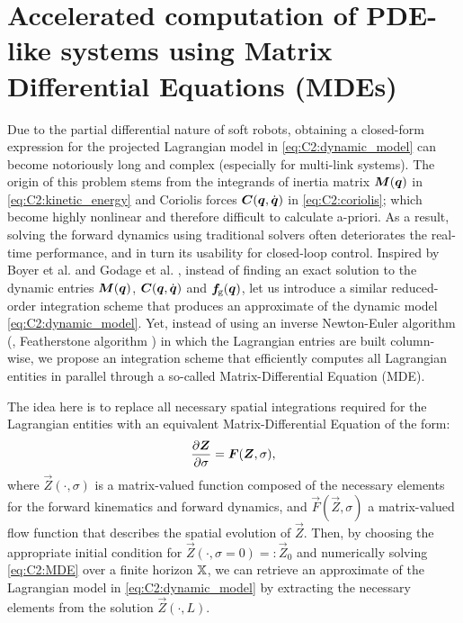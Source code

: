 \section[Accelerated computation of PDE-like systems]{Accelerated computation of PDE-like systems using Matrix Differential Equations (MDEs)}
\label{sec: chap2 section header}
Due to the partial differential nature of soft robots, obtaining a closed-form expression for the projected Lagrangian model in \eqref{eq:C2:dynamic_model} can become notoriously long and complex (especially for multi-link systems). The origin of this problem stems from the integrands of inertia matrix $\boldsymbol{M}({\boldsymbol{q}})$ in \eqref{eq:C2:kinetic_energy} and Coriolis forces $\boldsymbol{C}({\boldsymbol{q}},{\dot{\boldsymbol{q}}})$ in \eqref{eq:C2:coriolis}; which become highly nonlinear and therefore difficult to calculate a-priori. As a result, solving the forward dynamics using traditional solvers often deteriorates the real-time performance, and in turn its usability for closed-loop control. Inspired by Boyer et al. \cite{Boyer2021} and Godage et al. 
\cite{Godage2016}, instead of finding an exact solution to the dynamic entries $\boldsymbol{M}({\boldsymbol{q}})$, $\boldsymbol{C}({\boldsymbol{q}},{\dot{\boldsymbol{q}}})$ and $\boldsymbol{f}\!_{\scriptstyle\textrm{g}}({\boldsymbol{q}})$, let us introduce a similar reduced-order integration scheme that produces an approximate of the dynamic model \eqref{eq:C2:dynamic_model}. Yet, instead of using an inverse Newton-Euler algorithm (\ie, Featherstone algorithm \cite{Spong2006}) in which the Lagrangian entries are built column-wise, we propose an integration scheme that efficiently computes all Lagrangian entities in parallel through a so-called Matrix-Differential Equation (MDE).

The idea here is to replace all necessary spatial integrations required for the Lagrangian entities with an equivalent Matrix-Differential Equation of the form:
%
\begin{equation}
\frac{\partial \boldsymbol{Z}}{\partial \sigma} = \boldsymbol{F}(\boldsymbol{Z},\sigma), \label{eq:C2:MDE}
\end{equation}
%
where $\vec{Z}(\cdot,\sigma)$ is a matrix-valued function composed of the necessary elements for the forward kinematics and forward dynamics, and $\vec{F}(\vec{Z},\sigma)$ a matrix-valued flow function that describes the spatial evolution of $\vec{Z}$. Then, by choosing the appropriate initial condition for $\vec{Z}(\cdot,\sigma = 0) =: \vec{Z}_0$ and numerically solving \eqref{eq:C2:MDE} over a finite horizon $\mathbb{X}$, we can retrieve an approximate of the Lagrangian model in
\eqref{eq:C2:dynamic_model} by extracting the necessary elements from the solution $\vec{Z}(\cdot,L)$.

